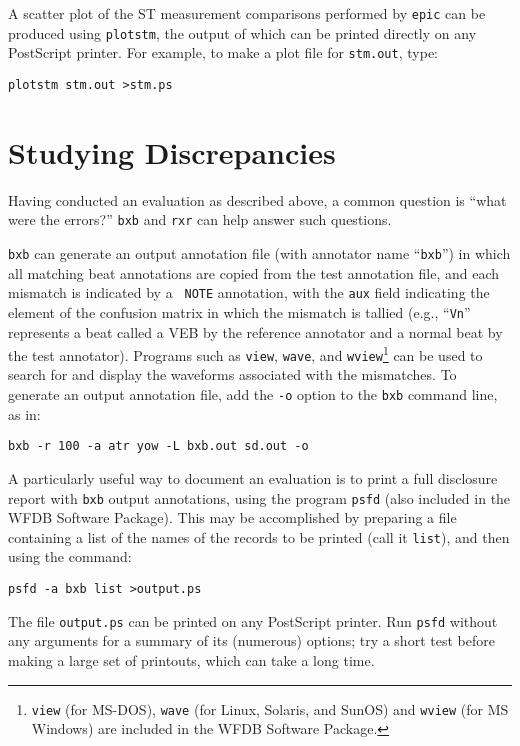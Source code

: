 A scatter plot of the ST measurement comparisons performed by {\tt epic} can be
produced using {\tt plotstm}, the output of which can be printed directly on
any PostScript printer.  For example, to make a plot file for {\tt stm.out},
type:
\begin{verbatim}
plotstm stm.out >stm.ps
\end{verbatim}

\section{Studying Discrepancies}

Having conducted an evaluation as described above, a common question
is ``what were the errors?''  {\tt bxb} and {\tt rxr} can help
answer such questions.

{\tt bxb} can generate an output annotation file (with annotator name
``{\tt bxb}'') in which all matching beat annotations are copied from
the test annotation file, and each mismatch is indicated by a {\tt
NOTE} annotation, with the {\tt aux} field indicating the element of
the confusion matrix in which the mismatch is tallied (e.g., ``{\tt Vn}''
represents a beat called a VEB by the reference annotator and a normal
beat by the test annotator).  Programs such as {\tt view},
{\tt wave}, and {\tt wview}\footnote{
{\tt view} (for MS-DOS),  {\tt wave} (for Linux, Solaris, and SunOS) and
{\tt wview} (for MS Windows) are included in the WFDB Software Package.}
can be used to search for and display the waveforms associated with the
mismatches.  To generate an output annotation file, add the {\tt -o} option to
the {\tt bxb} command line, as in:
\begin{verbatim}
bxb -r 100 -a atr yow -L bxb.out sd.out -o
\end{verbatim}
A particularly useful way to document an evaluation is to print a
full disclosure report with {\tt bxb} output annotations, using the
program {\tt psfd} (also included in the WFDB Software Package).  This may
be accomplished by preparing a file containing a list of the names of
the records to be printed (call it {\tt list}), and then using the
command:
\begin{verbatim}
psfd -a bxb list >output.ps
\end{verbatim}
The file {\tt output.ps} can be printed on any PostScript printer.
Run {\tt psfd} without any arguments for a summary of its (numerous)
options;  try a short test before making a large set of printouts,
which can take a long time.

